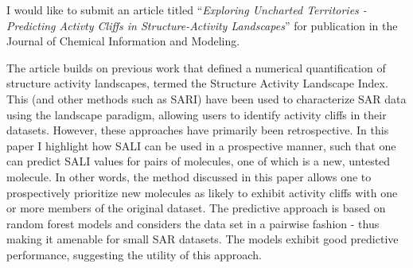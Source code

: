 \documentclass[11pt]{newlfm}
\begin{document}
    \begin{newlfm}
      I would like to submit an article titled ``\emph{Exploring
        Uncharted Territories - Predicting Activty Cliffs in
        Structure-Activity Landscapes}'' for publication in the
      Journal of Chemical Information and Modeling.

      The article builds on previous work that defined a numerical
      quantification of structure activity landscapes, termed the
      Structure Activity Landscape Index. This (and other methods such
      as SARI) have been used to characterize SAR data using the
      landscape paradigm, allowing users to identify activity cliffs
      in their datasets. However, these approaches have primarily been
      retrospective. In this paper I highlight how SALI can be used in
      a prospective manner, such that one can predict SALI values for
      pairs of molecules, one of which is a new, untested molecule. In
      other words, the method discussed in this paper allows one to
      prospectively prioritize new molecules as likely to exhibit
      activity cliffs with one or more members of the original
      dataset. The predictive approach is based on random forest
      models and considers the data set in a pairwise fashion - thus
      making it amenable for small SAR datasets. The models exhibit
      good predictive performance, suggesting the utility of this
      approach.
    \end{newlfm}
\end{document}
